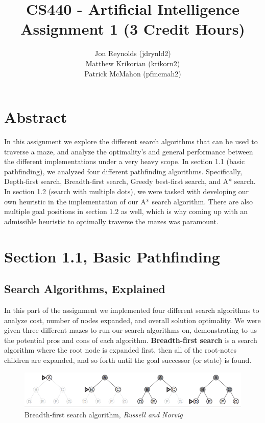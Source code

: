 \documentclass[titlepage]{article}
\title{CS440 - Artificial Intelligence \\ Assignment 1 (3 Credit Hours)}
\author{Jon Reynolds (jdrynld2) \\ Matthew Krikorian (krikorn2) \\ Patrick McMahon (pfmcmah2)}
\begin{document}
\maketitle

\section{Abstract}
In this assignment we explore the different search algorithms that can be used to traverse a maze, and analyze the optimality's and general performance between the different implementations under a very heavy scope. In section 1.1 (basic pathfinding), we analyzed four different pathfinding algorithms. Specifically, Depth-first search, Breadth-first search, Greedy best-first search, and A* search. In section 1.2 (search with multiple dots), we were tasked with developing our own heuristic in the implementation of our A* search algorithm. There are also multiple goal positions in section 1.2 as well, which is why coming up with an admissible heuristic to optimally traverse the mazes was paramount.

\section{Section 1.1, Basic Pathfinding} 

\subsection{Search Algorithms, Explained}
In this part of the assignment we implemented four different search algorithms to analyze cost, number of nodes expanded, and overall solution optimality. We were given three different mazes to run our search algorithms on, demonstrating to us the potential pros and cons of each algorithm. \textbf{Breadth-first search} is a search algorithm where the root node is expanded first, then all of the root-notes children are expanded, and so forth until the goal successor (or state) is found. 

\begin{figure}[h!]
\includegraphics[width=\linewidth]{bfs.png}
\caption{Breadth-first search algorithm, \textit{Russell and Norvig}}
\label{fig:BFSdiagram1}
\end{figure}
\end{document}
